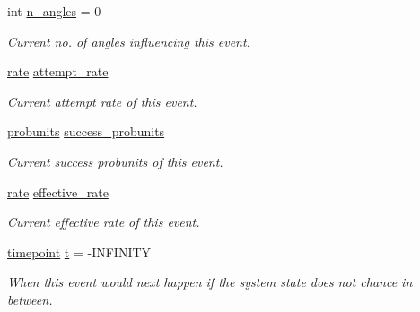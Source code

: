 \begin{DoxyCompactItemize}
\item 
\mbox{\label{structtricl_1_1event__data_a6c10029d49048e80c295b346a5b987f9}} 
int \hyperlink{structtricl_1_1event__data_a6c10029d49048e80c295b346a5b987f9}{n\+\_\+angles} = 0
\begin{DoxyCompactList}\small\item\em Current no. of angles influencing this event. \end{DoxyCompactList}\item 
\mbox{\label{structtricl_1_1event__data_ab1a97598f3ac7947b16c785138d754df}} 
\hyperlink{namespacetricl_ae42d2696f294300a43e0f5edf4875479}{rate} \hyperlink{structtricl_1_1event__data_ab1a97598f3ac7947b16c785138d754df}{attempt\+\_\+rate}
\begin{DoxyCompactList}\small\item\em Current attempt rate of this event. \end{DoxyCompactList}\item 
\mbox{\label{structtricl_1_1event__data_af2cce9d4c534778696f87867c156d076}} 
\hyperlink{namespacetricl_af8f8f9076e92e1c664ffa96f18d038a5}{probunits} \hyperlink{structtricl_1_1event__data_af2cce9d4c534778696f87867c156d076}{success\+\_\+probunits}
\begin{DoxyCompactList}\small\item\em Current success probunits of this event. \end{DoxyCompactList}\item 
\mbox{\label{structtricl_1_1event__data_ab49467b5b4ab42e2084499866f575d06}} 
\hyperlink{namespacetricl_ae42d2696f294300a43e0f5edf4875479}{rate} \hyperlink{structtricl_1_1event__data_ab49467b5b4ab42e2084499866f575d06}{effective\+\_\+rate}
\begin{DoxyCompactList}\small\item\em Current effective rate of this event. \end{DoxyCompactList}\item 
\mbox{\label{structtricl_1_1event__data_acd1cbe2baf952a87e40d96d5ff60ccb6}} 
\hyperlink{namespacetricl_a720ff6a29f998e11e1d3622fc8df64b1}{timepoint} \hyperlink{structtricl_1_1event__data_acd1cbe2baf952a87e40d96d5ff60ccb6}{t} = -\/I\+N\+F\+I\+N\+I\+TY
\begin{DoxyCompactList}\small\item\em When this event would next happen if the system state does not chance in between. \end{DoxyCompactList}\end{DoxyCompactItemize}


